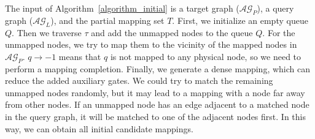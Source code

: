 \documentclass[runningheads]{llncs}
\begin{document}
The input of Algorithm~\ref{algorithm_initial} is a target graph ($\mathcal{AG}_{P}$), a query graph ($\mathcal{AG}_{L}$), and the partial mapping set $T$. First, we initialize an empty queue $Q$.
Then we traverse $\tau$ and add the unmapped nodes to the queue $Q$. For the unmapped nodes, we try to map them to the vicinity of the mapped nodes in $\mathcal{AG}_{P}$.  $\textit{q}\rightarrow -1$ means that $\textit{q}$ is not mapped to any physical node, so we need to perform a mapping completion. Finally, we generate a dense mapping, which can reduce the added auxiliary gates. We could try to match the remaining unmapped nodes randomly, but it may lead to a mapping with a node far away from other nodes. If an unmapped node has an edge adjacent to a matched node in the query graph, it will be matched to one of the adjacent nodes first.  In this way, we can obtain all initial candidate mappings.
\end{document}
